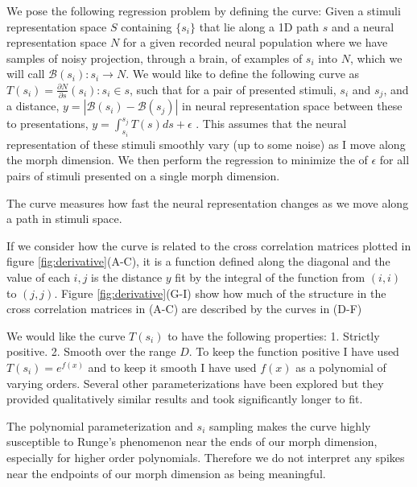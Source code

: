 We pose the following regression problem by defining the \Thielk curve:
Given a stimuli representation space $S$ containing $\{s_i\}$ that lie along a 1D path $s$ and a neural representation space $N$ for a given recorded neural population where we have samples of noisy projection, through a brain, of examples of $s_i$ into $N$, which we will call $\mathcal{B}(s_i):s_i \to N$.
We would like to define the following curve as $T(s_i)=\frac{\partial N}{\partial s} (s_i): s_i \in s$, such that for a pair of presented stimuli, $s_i$ and $s_j$, and a distance, $y=|\mathcal{B}(s_i) - \mathcal{B}(s_j)|$ in neural representation space between these to presentations, $y = \int_{s_i}^{s_j}T(s)ds + \epsilon$ . This assumes that the neural representation of these stimuli smoothly vary (up to some noise) as I move along the morph dimension. We then perform the regression to minimize the \MSE of $\epsilon$ for all pairs of stimuli presented on a single morph dimension.

The \Thielk curve measures how fast the neural representation changes as we move along a path in stimuli space. 

If we consider how the \Thielk curve is related to the cross correlation matrices plotted in figure \ref{fig:derivative}(A-C), it is a function defined along the diagonal and the value of each $i,j$ is the distance $y$ fit by the integral of the function from $(i,i)$ to $(j, j)$. Figure \ref{fig:derivative}(G-I) show how much of the structure in the cross correlation matrices in (A-C) are described by the \Thielk curves in (D-F)

We would like the \Thielk curve $T(s_i)$ to have the following properties: 1. Strictly positive. 2. Smooth over the range $D$.
To keep the function positive I have used $T(s_i)=e^{f(x)}$ and to keep it smooth I have used $f(x)$ as a polynomial of varying orders.
Several other parameterizations have been explored but they provided qualitatively similar results and took significantly longer to fit.

The polynomial parameterization and $s_i$ sampling makes the \Thielk curve highly susceptible to Runge's phenomenon near the ends of our morph dimension, especially for higher order polynomials. Therefore we do not interpret any spikes near the endpoints of our morph dimension as being meaningful.

